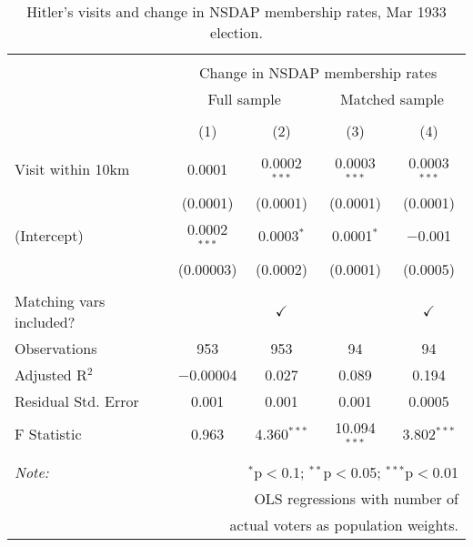 
\begin{table}[!htbp] \centering 
  \caption{Hitler's visits and change in NSDAP membership rates, Mar 1933 election.} 
  \label{tab:ols-d_p_members-4} 
\begin{tabular}{@{\extracolsep{5pt}}lcccc} 
\\[-1.8ex]\hline 
\hline \\[-1.8ex] 
 & \multicolumn{4}{c}{Change in NSDAP membership rates} \\ 
\cline{2-5} 
 & \multicolumn{2}{c}{Full sample} & \multicolumn{2}{c}{Matched sample} \\ 
\\[-1.8ex] & (1) & (2) & (3) & (4)\\ 
\hline \\[-1.8ex] 
 Visit within 10km & 0.0001 & 0.0002$^{***}$ & 0.0003$^{***}$ & 0.0003$^{***}$ \\ 
  & (0.0001) & (0.0001) & (0.0001) & (0.0001) \\ 
  (Intercept) & 0.0002$^{***}$ & 0.0003$^{*}$ & 0.0001$^{*}$ & $-$0.001 \\ 
  & (0.00003) & (0.0002) & (0.0001) & (0.0005) \\ 
 \hline \\[-1.8ex] 
Matching vars included? &  & \multicolumn{1}{c}{$\checkmark$} &  & \multicolumn{1}{c}{$\checkmark$} \\ 
Observations & 953 & 953 & 94 & 94 \\ 
Adjusted R$^{2}$ & $-$0.00004 & 0.027 & 0.089 & 0.194 \\ 
Residual Std. Error & 0.001 & 0.001 & 0.001 & 0.0005 \\ 
F Statistic & 0.963 & 4.360$^{***}$ & 10.094$^{***}$ & 3.802$^{***}$ \\ 
\hline 
\hline \\[-1.8ex] 
\textit{Note:}  & \multicolumn{4}{r}{$^{*}$p$<$0.1; $^{**}$p$<$0.05; $^{***}$p$<$0.01} \\ 
 & \multicolumn{4}{r}{OLS regressions with number of} \\ 
 & \multicolumn{4}{r}{actual voters as population weights.} \\ 
\end{tabular} 
\end{table} 
